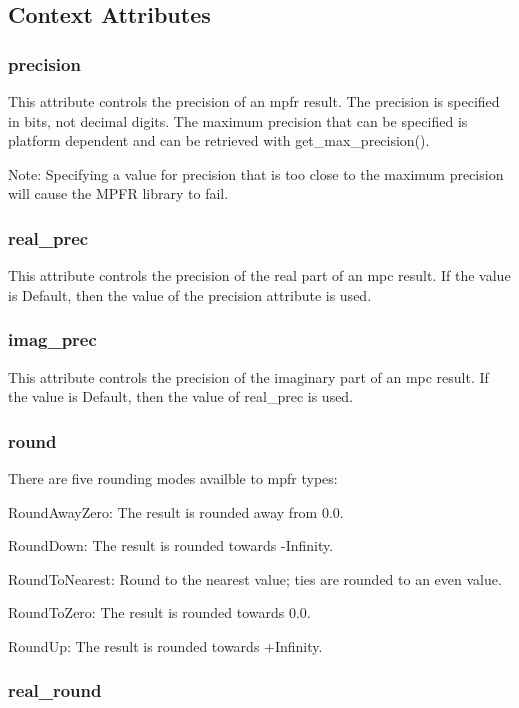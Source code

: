 \subsection{Context Attributes}

\subsubsection{precision}

This attribute controls the precision of an mpfr result. The precision is specified in bits, not
decimal digits. The maximum precision that can be specified is platform dependent and can be
retrieved with get\_max\_precision().

Note: Specifying a value for precision that is too close to the maximum precision will cause the
MPFR library to fail.

\subsubsection{real\_prec}

This attribute controls the precision of the real part of an mpc result. If the value is Default,
then the value of the precision attribute is used.

\subsubsection{imag\_prec}

This attribute controls the precision of the imaginary part of an mpc result. If the value is
Default, then the value of real\_prec is used.

\subsubsection{round}

There are five rounding modes availble to mpfr types:

RoundAwayZero: The result is rounded away from 0.0.

RoundDown: The result is rounded towards -Infinity.

RoundToNearest: Round to the nearest value; ties are rounded to an even value.

RoundToZero: The result is rounded towards 0.0.

RoundUp: The result is rounded towards +Infinity.



\subsubsection{real\_round}

